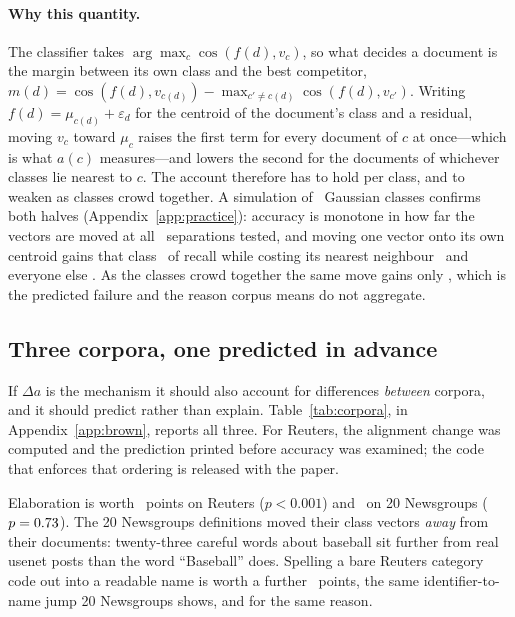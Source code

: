 \documentclass[11pt]{article}
\begin{document}
\paragraph{Why this quantity.} The classifier takes
$\arg\max_c \cos(f(d), v_c)$, so what decides a document is the margin between
its own class and the best competitor,
$m(d) = \cos(f(d), v_{c(d)}) - \max_{c' \neq c(d)} \cos(f(d), v_{c'})$. Writing
$f(d) = \mu_{c(d)} + \varepsilon_d$ for the centroid of the document's class and
a residual, moving $v_c$ toward $\mu_c$ raises the first term for every document
of $c$ at once---which is what $a(c)$ measures---and lowers the second for the
documents of whichever classes lie nearest to $c$. The account therefore has to
hold per class, and to weaken as classes crowd together. A simulation of
\SynthClasses\ Gaussian classes confirms both halves (Appendix~\ref{app:practice}):
accuracy is monotone in how far the vectors are moved at all
\SynthSeparations\ separations tested, and moving one vector onto its own
centroid gains that class \SynthOwnGain\ of recall while costing its nearest
neighbour \SynthNeighbourLoss\ and everyone else \SynthOtherChange. As the
classes crowd together the same move gains only \SynthNarrowOwnGain, which is
the predicted failure and the reason corpus means do not aggregate.

\subsection{Three corpora, one predicted in advance}
\label{sec:corpora}

If $\Delta a$ is the mechanism it should also account for differences
\emph{between} corpora, and it should predict rather than explain.
Table~\ref{tab:corpora}, in Appendix~\ref{app:brown}, reports all three. For Reuters, the alignment change was
computed and the prediction printed before accuracy was examined; the code that
enforces that ordering is released with the paper.

Elaboration is worth \ReutersGain~points on Reuters ($p < 0.001$) and
\NewsGain\ on 20 Newsgroups ($p = 0.73$). The 20 Newsgroups definitions moved
their class vectors \emph{away} from their documents: twenty-three careful words
about baseball sit further from real usenet posts than the word ``Baseball''
does. Spelling a bare Reuters category code out into a readable name is worth a
further \ReutersCodeGain~points, the same identifier-to-name jump 20 Newsgroups
shows, and for the same reason.
\end{document}

